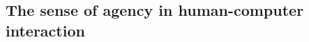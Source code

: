 \subsection{The sense of agency in human-computer interaction}
\begin{comment}



- intention / voluntary movement is important for sense of agency
- involuntary movements produce less binding than do voluntary actions, or even reverse the effect entirely (Yoshi und Harrard 2013, Moore, Wegner und Harrard 2009)
it has been shown, that mere peripheral body movements, elicited by TMS simulations, produce a perceptual repulsion opposite to intentional binding in truly operant intentional actions (Haggard, Clark 2002)

There is an ongoing debate, whether the temporal attraction is specific to intentional movements, or is more generally related to the perception between action and outcome (Buhner 2012)
--> they suggest intentional action is not necessary for temporal binding, but that the binding results from a causal relation linking actions with consequences -- more general causal binding -- do we need to go there?

One idea: - reach "we-mode" in human-machine joint control ---> decode human intention (Zander 2011, Felke 2019, Shiskin 2016)
- maintain sense of agency in augmented interactions 
- doing this by leveraging action intention in brain



Experiencing control is an important factor in human-computer interaction (see Shneiderman and Nielsen). 


The sense of agency, or this being in the "driving seat when it comes to our own actions"~\cite{Moore2016-ub} can be subdivided into the \textit{feeling} of agency, a low-level pre-reflective sensory process, and the \textit{judgement} of agency, a higher level reflective cognitive process, ~\cite{Moore2016-ub, Danry2022-xk}.

Agency is largely explained with a comparator model, describing internal computational mechanisms of human action control 
-- comparator model (Blakemore 2002, Frith 2000, Frith 2005)
-- integrate predictive coding??

- In the words of Harrard: making an association between action and outcome (Intention - Volition-Movement-Agency -Effect) --> find the source; is from yt video


\end{comment}
